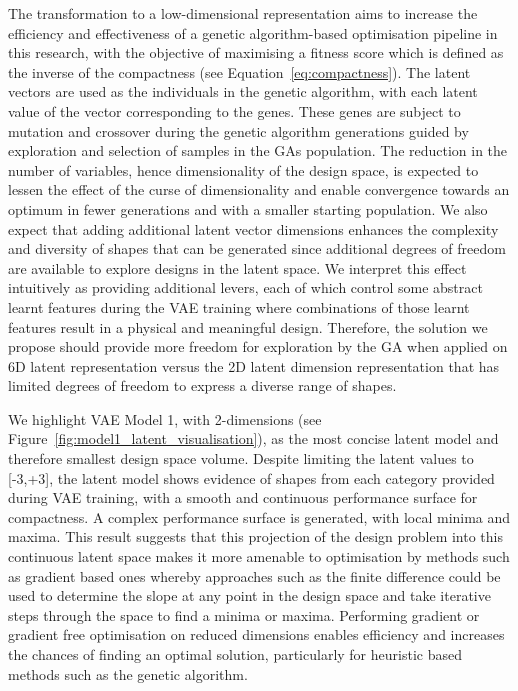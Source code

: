 \documentclass{article}
\begin{document}
The transformation to a low-dimensional representation aims to increase the efficiency and effectiveness of a genetic algorithm-based optimisation pipeline in this research, with the objective of maximising a fitness score which is defined as the inverse of the compactness (see Equation~\eqref{eq:compactness}). The latent vectors are used as the individuals in the genetic algorithm, with each latent value of the vector corresponding to the genes. These genes are subject to mutation and crossover during the genetic algorithm generations guided by exploration and selection of samples in the GAs population. The reduction in the number of variables, hence dimensionality of the design space, is expected to lessen the effect of the curse of dimensionality and enable convergence towards an optimum in fewer generations and with a smaller starting population. We also expect that adding additional latent vector dimensions enhances the complexity and diversity of shapes that can be generated since additional degrees of freedom are available to explore designs in the latent space. We interpret this effect intuitively as providing additional levers, each of which control some abstract learnt features during the VAE training where combinations of those learnt features result in a physical and meaningful design. Therefore, the solution we propose should provide more freedom for exploration by the GA when applied on 6D latent representation versus the 2D latent dimension representation that has limited degrees of freedom to express a diverse range of shapes.

We highlight VAE Model 1, with 2-dimensions (see Figure~\ref{fig:model1_latent_visualisation}), as the most concise latent model and therefore smallest design space volume. Despite limiting the latent values to [-3,+3], the latent model shows evidence of shapes from each category provided during VAE training, with a smooth and continuous performance surface for compactness. A complex performance surface is generated, with local minima and maxima. This result suggests that this projection of the design problem into this continuous latent space makes it more amenable to optimisation by methods such as gradient based ones whereby approaches such as the finite difference could be used to determine the slope at any point in the design space and take iterative steps through the space to find a minima or maxima. Performing gradient or gradient free optimisation on reduced dimensions enables efficiency and increases the chances of finding an optimal solution, particularly for heuristic based methods such as the genetic algorithm. 
\end{document}
